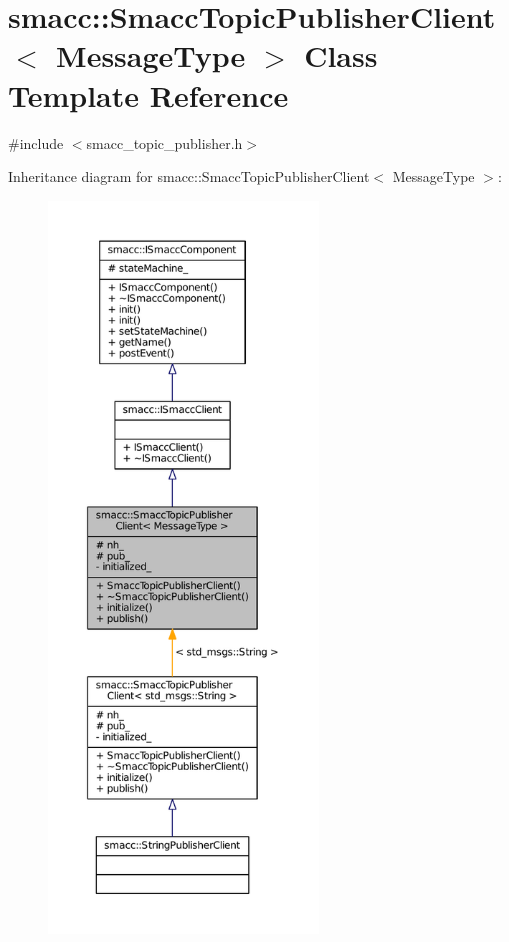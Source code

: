 \hypertarget{classsmacc_1_1SmaccTopicPublisherClient}{}\section{smacc\+:\+:Smacc\+Topic\+Publisher\+Client$<$ Message\+Type $>$ Class Template Reference}
\label{classsmacc_1_1SmaccTopicPublisherClient}


{\ttfamily \#include $<$smacc\+\_\+topic\+\_\+publisher.\+h$>$}



Inheritance diagram for smacc\+:\+:Smacc\+Topic\+Publisher\+Client$<$ Message\+Type $>$\+:
\nopagebreak
\begin{figure}[H]
\begin{center}
\leavevmode
\includegraphics[height=550pt]{classsmacc_1_1SmaccTopicPublisherClient__inherit__graph}
\end{center}
\end{figure}


